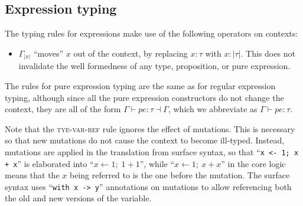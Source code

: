 \documentclass[acmsmall,nonacm]{acmart}
\newcommand{\core}[1]{\left| #1 \right|}
\newcommand{\proves}{\vdash}
\newcommand{\makes}{\dashv}
\begin{document}
\subsection{Expression typing}

The typing rules for expressions make use of the following operators on contexts:

\begin{itemize}
  \item $\Gamma_{\core x}$ ``moves'' $x$ out of the context, by replacing $x:\tau$ with $x:\core\tau$. This does not invalidate the well formedness of any type, proposition, or pure expression.
\end{itemize}

The rules for pure expression typing are the same as for regular expression typing, although since all the pure expression constructors do not change the context, they are all of the form $\Gamma\proves pe:\tau\makes \Gamma$, which we abbreviate as $\Gamma\proves pe:\tau$.

Note that the \textsc{tye-var-ref} rule ignores the effect of mutations. This is necessary so that new mutations do not cause the context to become ill-typed. Instead, mutations are applied in the translation from surface syntax, so that ``\texttt{x <- 1; x + x}'' is elaborated into ``$x\gets 1;\;1+1$'', while ``$x\gets 1;\ x+x$'' in the core logic means that the $x$ being referred to is the one before the mutation. The surface syntax uses ``\texttt{with x -> y}'' annotations on mutations to allow referencing both the old and new versions of the variable.
\end{document}
